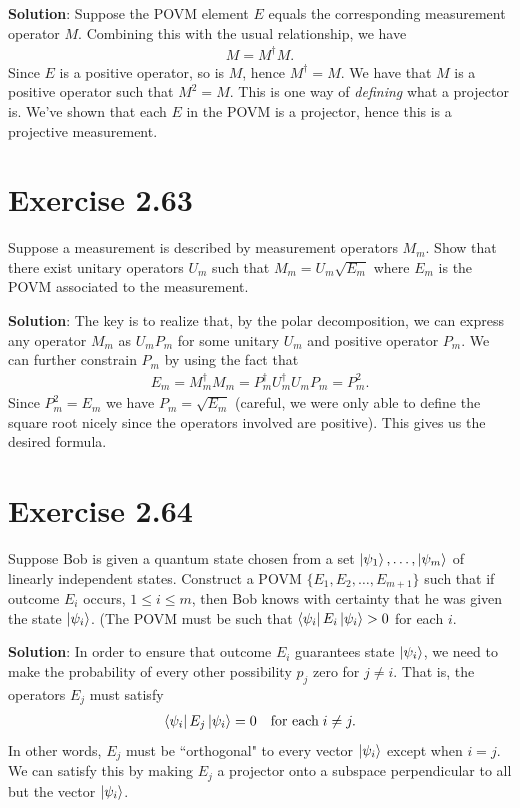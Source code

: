 \documentclass{book}
\begin{document}
    \textbf{Solution}: Suppose the POVM element $E$ equals the corresponding measurement operator $M$. Combining this with the usual relationship, we have
    \begin{align}
        M = M^\dagger M.
    \end{align}
    Since $E$ is a positive operator, so is $M$, hence $M^\dagger = M$. We have that $M$ is a positive operator such that $M^2 = M$. This is one way of \emph{defining} what a projector is. We've shown that each $E$ in the POVM is a projector, hence this is a projective measurement.

\section*{Exercise 2.63}
    Suppose a measurement is described by measurement operators $M_m$. Show that there exist unitary operators $U_m$ such that $M_m = U_m \sqrt{E_m}$ where $E_m$ is the POVM associated to the measurement.

    \textbf{Solution}: The key is to realize that, by the polar decomposition, we can express any operator $M_m$ as $U_m P_m$ for some unitary $U_m$ and positive operator $P_m$. We can further constrain $P_m$ by using the fact that
    \begin{align}
        E_m = M_m^\dagger M_m = P_m^\dagger U_m^\dagger U_m P_m = P_m^2. 
    \end{align}
    Since $P_m^2 = E_m$ we have $P_m = \sqrt{E_m}$ (careful, we were only able to define the square root nicely since the operators involved are positive). This gives us the desired formula.

\section*{Exercise 2.64}
    Suppose Bob is given a quantum state chosen from a set $\ket{\psi_1},\dots, \ket{\psi_m}$ of linearly independent states. Construct a POVM $\{E_1, E_2, \dots, E_{m+1}\}$ such that if outcome $E_i$ occurs, $1 \leq i \leq m$, then Bob knows with certainty that he was given the state $\ket{\psi_i}$. (The POVM must be such that $\bra{\psi_i}E_i \ket{\psi_i} > 0$ for each $i$.

    \textbf{Solution}: In order to ensure that outcome $E_i$ guarantees state $\ket{\psi_i}$, we need to make the probability of every other possibility $p_j$ zero for $j \neq i$. That is, the operators $E_j$ must satisfy
    \begin{align} \label{eq:2.64_condition}
        \bra{\psi_i}E_j \ket{\psi_i} = 0 \quad \text{for each}\;i \neq j.
    \end{align}
    In other words, $E_j$ must be ``orthogonal" to every vector $\ket{\psi_i}$ except when $i = j$. We can satisfy this by making $E_j$ a projector onto a subspace perpendicular to all but the vector $\ket{\psi_i}$. 
    
\end{document}
